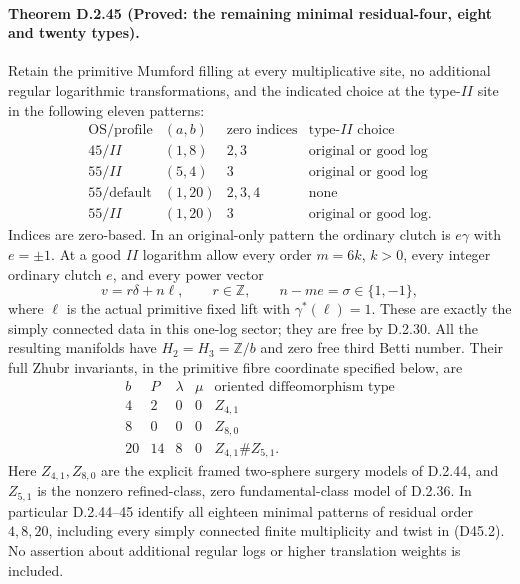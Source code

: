 \paragraph{Theorem D.2.45 (Proved: the remaining minimal residual-four, eight and twenty types).}
Retain the primitive Mumford filling at every multiplicative site,
no additional regular logarithmic transformations, and the indicated
choice at the type-$II$ site in the following eleven patterns:
\[
\begin{array}{c|c|c|c}
 \mathrm{OS/profile}&(a,b)&\text{zero indices}&\text{type-}II\text{ choice}\\\hline
 45/II&(1,8)&2,3&\text{original or good log}\\
 55/II&(5,4)&3&\text{original or good log}\\
 55/\mathrm{default}&(1,20)&2,3,4&\text{none}\\
 55/II&(1,20)&3&\text{original or good log}.
\end{array}                                                    \tag{D45.1}
\]
Indices are zero-based. In an original-only pattern the ordinary
clutch is $e\gamma$ with $e=\pm1$. At a good $II$ logarithm allow
every order $m=6k$, $k>0$, every integer ordinary clutch $e$, and
every power vector
\[
 v=r\delta+n\ell,\qquad r\in\mathbb Z,
 \qquad n-me=\sigma\in\{1,-1\},                             \tag{D45.2}
\]
where $\ell$ is the actual primitive fixed lift with
$\gamma^*(\ell)=1$. These are exactly the simply connected data
in this one-log sector; they are free by D.2.30.
All the resulting manifolds have $H_2=H_3=\mathbb Z/b$ and
zero free third Betti number. Their full Zhubr invariants, in
the primitive fibre coordinate specified below, are
\[
 \begin{array}{c|c|c|c|c}
 b&P&\lambda&\mu&\text{oriented diffeomorphism type}\\\hline
 4&2&0&0&Z_{4,1}\\
 8&0&0&0&Z_{8,0}\\
 20&14&8&0&Z_{4,1}\#Z_{5,1}.
 \end{array}                                                 \tag{D45.3}
\]
Here $Z_{4,1},Z_{8,0}$ are the explicit framed two-sphere surgery
models of D.2.44, and $Z_{5,1}$ is the nonzero refined-class,
zero fundamental-class model of D.2.36. In particular D.2.44--45
identify all eighteen minimal patterns of residual order
$4,8,20$, including every simply connected finite multiplicity
and twist in (D45.2). No assertion about additional regular
logs or higher translation weights is included.


